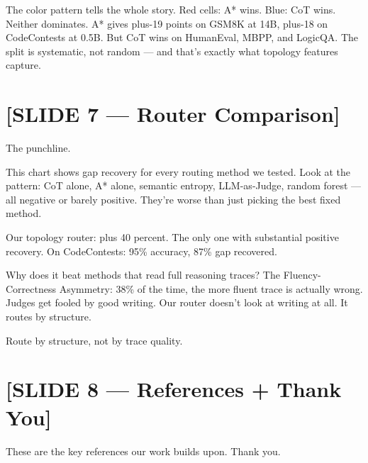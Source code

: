 \documentclass[11pt]{article}
\begin{document}
The color pattern tells the whole story. Red cells: A* wins. Blue: CoT wins. Neither dominates. A* gives plus-19 points on GSM8K at 14B, plus-18 on CodeContests at 0.5B. But CoT wins on HumanEval, MBPP, and LogicQA. The split is systematic, not random --- and that's exactly what topology features capture.

\section{[SLIDE 7 --- Router Comparison]}

The punchline.

This chart shows gap recovery for every routing method we tested. Look at the pattern: CoT alone, A* alone, semantic entropy, LLM-as-Judge, random forest --- all negative or barely positive. They're worse than just picking the best fixed method.

Our topology router: plus 40 percent. The only one with substantial positive recovery. On CodeContests: 95\% accuracy, 87\% gap recovered.

Why does it beat methods that read full reasoning traces? The Fluency-Correctness Asymmetry: 38\% of the time, the more fluent trace is actually wrong. Judges get fooled by good writing. Our router doesn't look at writing at all. It routes by structure.

Route by structure, not by trace quality.

\section{[SLIDE 8 --- References + Thank You]}

These are the key references our work builds upon. Thank you.
\end{document}
